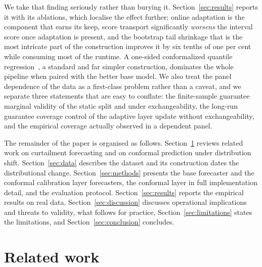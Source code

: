\documentclass[preprint,3p,times]{elsarticle}
\providecommand{\DIFaddtex}[1]{{\protect\color{blue} \sf #1}} %
\providecommand{\DIFdeltex}[1]{{\protect\color{red} \scriptsize #1}} %
\providecommand{\DIFaddbegin}{} %
\providecommand{\DIFaddend}{} %
\providecommand{\DIFdelbegin}{} %
\providecommand{\DIFdelend}{} %
\providecommand{\DIFadd}[1]{\texorpdfstring{\DIFaddtex{#1}}{#1}} %
\providecommand{\DIFdel}[1]{\texorpdfstring{\DIFdeltex{#1}}{}} %
\begin{document}
\DIFadd{We take that finding seriously rather than burying it. Section~\ref{sec:results} reports it with its ablations, which localise the effect further: online adaptation is the component that earns its keep, score transport significantly \emph{worsens} the interval score once adaptation is present, and the bootstrap tail shrinkage that is the most intricate part of the construction improves it by six tenths of one per cent while consuming most of the runtime. A one-sided conformalized quantile regression~\cite{romano2019}, a standard and far simpler construction, dominates the whole pipeline when paired with the better base model. We also treat the panel dependence of the data as a first-class problem rather than a caveat, and we separate three statements that are easy to conflate: the }\DIFaddend finite-sample \DIFdelbegin \DIFdel{guarantee }\DIFdelend \DIFaddbegin \DIFadd{marginal validity }\DIFaddend of the static split \DIFdelbegin \DIFdel{and }\DIFdelend \DIFaddbegin \DIFadd{under exchangeability, }\DIFaddend the long-run \DIFdelbegin \DIFdel{guarantee }\DIFdelend \DIFaddbegin \DIFadd{coverage control }\DIFaddend of the adaptive \DIFdelbegin \DIFdel{layer}\DIFdelend \DIFaddbegin \DIFadd{update without exchangeability, and the empirical coverage actually observed in a dependent panel}\DIFaddend .

The remainder of the paper is organised as follows. Section~\ref{sec:related} reviews related work\DIFdelbegin \DIFdel{on curtailment forecasting and on conformal prediction under distribution shift}\DIFdelend . Section~\ref{sec:data} describes the dataset and \DIFdelbegin \DIFdel{its construction}\DIFdelend \DIFaddbegin \DIFadd{dates the distributional change}\DIFaddend . Section~\ref{sec:methods} presents the base \DIFdelbegin \DIFdel{forecaster and the conformal calibration layer }\DIFdelend \DIFaddbegin \DIFadd{forecasters, the conformal layer in full implementation detail, and the evaluation protocol}\DIFaddend . Section~\ref{sec:results} reports the empirical results\DIFdelbegin \DIFdel{on real data}\DIFdelend . Section~\ref{sec:discussion} discusses \DIFdelbegin \DIFdel{operational implications and threats to validity, }\DIFdelend \DIFaddbegin \DIFadd{what follows for practice, Section~\ref{sec:limitations} states the limitations, }\DIFaddend and Section~\ref{sec:conclusion} concludes.

\section{Related work}
\label{sec:related}
\end{document}
